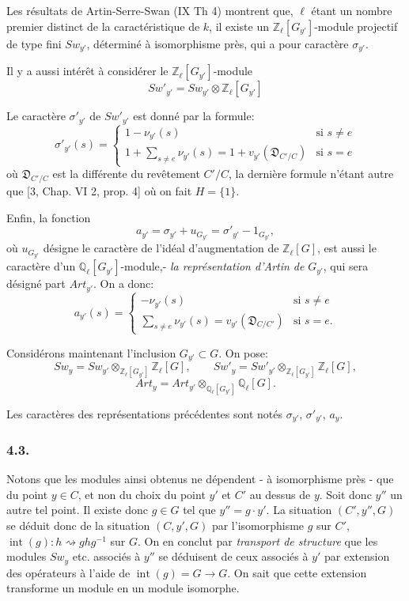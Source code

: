 Les résultats de Artin-Serre-Swan (IX Th 4) montrent que, $\ell$ étant un nombre premier distinct de la caractéristique de $k$, il existe un $\mathbb{Z}_\ell[G_{y'}]$-module projectif de type fini $Sw_{y'}$, déterminé à isomorphisme près, qui a pour caractère $\sigma_{y'}$.

Il y a aussi intérêt à considérer le $\mathbb{Z}_\ell[G_{y'}]$-module
\[
Sw'_{y'}=Sw_{y'}\otimes\mathbb{Z}_\ell[G_{y'}]
\tag{4.2.3}
\]

Le caractère $\sigma'_{y'}$ de $Sw'_{y'}$ est donné par la formule:
\[
\sigma'_{y'}(s)=
\begin{cases}
1-\nu_{y'}(s)& \text{si } s\ne e\\[0.4em]
\displaystyle 1+\sum_{s\ne e}\nu_{y'}(s)
=1+v_{y'}(\mathfrak{D}_{C'/C})& \text{si } s=e
\end{cases}
\tag{4.2.4}
\]
où $\mathfrak{D}_{C'/C}$ est la différente du
revêtement $C'/C$, la dernière formule n'étant autre que [3, Chap. VI 2, prop. 4] où on fait $H=\{1\}$.

Enfin, la fonction
\[
a_{y'}=\sigma_{y'}+u_{G_{y'}}=\sigma'_{y'}-1_{G_{y'}},
\tag{4.2.5}
\]
où $u_{G_{y'}}$ désigne le caractère de l'idéal d'augmentation de $\mathbb{Z}_\ell[G]$, est aussi le caractère d'un $\mathbb{Q}_\ell[G_{y'}]$-module,- \emph{la représentation d'Artin de} $G_{y'}$, qui sera désigné part $Art_{y'}$.
On a donc:
\[
a_{y'}(s)=
\begin{cases}
-\nu_{y'}(s)& \text{si } s\ne e\\[0.4em]
\displaystyle\sum_{s\ne e}\nu_{y'}(s)=v_{y'}(\mathfrak{D}_{C/C'})& \text{si } s=e.
\end{cases}
\tag{4.2.6}
\]

Considérons maintenant l'inclusion $G_{y'}\subset G$. On pose:
\[
Sw_y=Sw_{y'}\otimes_{\mathbb{Z}_\ell[G_{y'}]}\mathbb{Z}_\ell[G],
\qquad
Sw'_y=Sw'_{y'}\otimes_{\mathbb{Z}_\ell[G_{y'}]}\mathbb{Z}_\ell[G],
\tag{4.2.7}
\]
\[
Art_y=Art_{y'}\otimes_{\mathbb{Q}_\ell[G_{y'}]}\mathbb{Q}_\ell[G].
\tag{4.2.8}
\]

Les caractères des représentations précédentes sont notés $\sigma_{y'}$, $\sigma'_{y'}$, $a_y$.

\subsubsection*{4.3.}

Notons que les modules ainsi obtenus ne dépendent - à isomorphisme près - que du point $y\in C$, et non du choix du point $y'$ et $C'$ au dessus de $y$. Soit donc $y''$ un autre tel point. Il existe donc $g\in G$ tel que $y''=g\cdot y'$. La situation $(C',y'',G)$ se déduit donc de la situation $(C,y',G)$ par l'isomorphisme $g$ sur $C'$, $\operatorname{int}(g):h\rightsquigarrow ghg^{-1}$ sur $G$. On en conclut par \emph{transport de structure} que les modules $Sw_y$ etc. associés à $y''$ se déduisent de ceux associés à $y'$ par extension des opérateurs à l'aide de $\operatorname{int}(g)=G\to G$. On sait que cette extension transforme un module en un module isomorphe.

